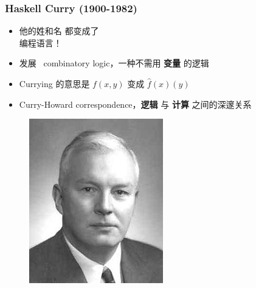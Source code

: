 \documentclass[17pt]{beamer}
\begin{document}
\begin{frame}
\frametitle{Haskell Curry (1900-1982)}
\fontsize{16}{16}\selectfont
\begin{minipage}[t]{0.62\linewidth}
	\begin{itemize}
		\item 他的姓和名 都变成了 \\编程语言！
		\item 发展 {\color{red} \ combinatory logic}，一种不需用 \textbf{变量} 的逻辑
		\item Currying 的意思是 $f(x,y)$ 变成 $\hat{f}(x)(y)$
		\item Curry-Howard correspondence，\textbf{逻辑} 与 \textbf{计算} 之间的深邃关系
	\end{itemize}
\end{minipage}
\hfill
\begin{minipage}[t]{0.35\linewidth}
	\begin{figure}[H]
		\includegraphics[scale=0.5]{Curry.jpg}
	\end{figure}
\end{minipage}
\end{frame}
\end{document}
